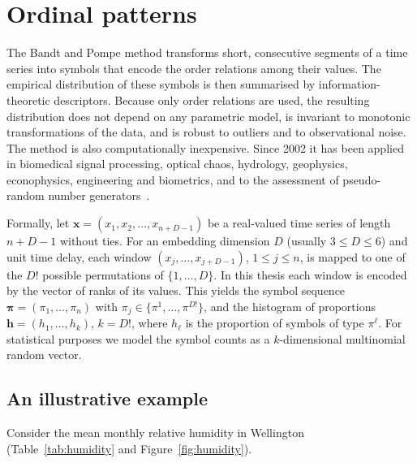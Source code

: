 \section{Ordinal patterns}\label{S:intro:op}

The Bandt and Pompe method transforms short, consecutive segments of a time series into symbols that encode the order relations among their values.
The empirical distribution of these symbols is then summarised by information-theoretic descriptors.
Because only order relations are used, the resulting distribution does not depend on any parametric model, is invariant to monotonic transformations of the data, and is robust to outliers and to observational noise.
The method is also computationally inexpensive.
Since 2002 it has been applied in biomedical signal processing, optical chaos, hydrology, geophysics, econophysics, engineering and biometrics, and to the assessment of pseudo-random number generators~\cite{Zanin2012}.

Formally, let $\bm{x}=(x_1,x_2,\dots,x_{n+D-1})$ be a real-valued time series of length $n+D-1$ without ties.
For an embedding dimension $D$ (usually $3\le D\le 6$) and unit time delay, each window $(x_j,\dots,x_{j+D-1})$, $1\le j\le n$, is mapped to one of the $D!$ possible permutations of $\{1,\dots,D\}$.
In this thesis each window is encoded by the vector of ranks of its values.
This yields the symbol sequence $\bm{\pi}=(\pi_1,\dots,\pi_n)$ with $\pi_j\in\{\pi^1,\dots,\pi^{D!}\}$, and the histogram of proportions $\bm{h}=(h_1,\dots,h_{k})$, $k=D!$, where $h_\ell$ is the proportion of symbols of type $\pi^\ell$.
For statistical purposes we model the symbol counts as a $k$-dimensional multinomial random vector.

\subsection{An illustrative example}\label{S:intro:example}

Consider the mean monthly relative humidity in Wellington (Table~\ref{tab:humidity} and Figure~\ref{fig:humidity}).

